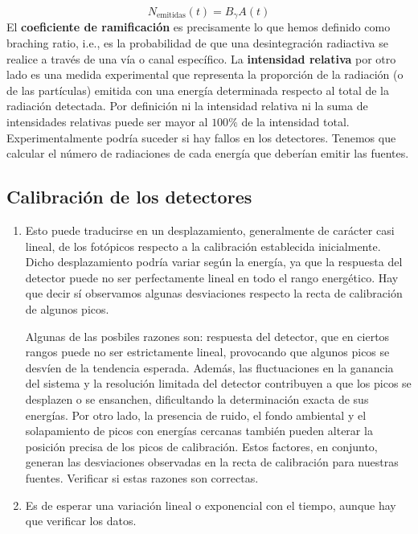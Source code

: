 \documentclass[11pt]{article}
\begin{document}
\begin{enumerate}[label=\alph*)]
    \begin{equation}
        N_{\text{emitidas}} (t) = B_\gamma A(t)
    \end{equation}
    El \textbf{coeficiente de ramificación} es precisamente lo que hemos definido como braching ratio, i.e., es la probabilidad de que una desintegración radiactiva se realice a través de una vía o canal específico. La \textbf{intensidad relativa} por otro lado es una medida experimental que representa la proporción de la radiación (o de las partículas) emitida con una energía determinada respecto al total de la radiación detectada. Por definición ni la intensidad relativa ni la suma de intensidades relativas puede ser mayor al $100\%$ de la intensidad total. Experimentalmente podría suceder si hay fallos en los detectores. \textcolor{BrickRed}{Tenemos que calcular el número de radiaciones de cada energía que deberían emitir las fuentes.}
\end{enumerate}

\subsection{Calibración de los detectores}

\begin{enumerate}[label=\alph*)]
    \item Esto puede traducirse en un desplazamiento, generalmente de carácter casi lineal, de los fotópicos respecto a la calibración establecida inicialmente. Dicho desplazamiento podría variar según la energía, ya que la respuesta del detector puede no ser perfectamente lineal en todo el rango energético. \textcolor{BrickRed}{Hay que decir sí observamos algunas desviaciones respecto la recta de calibración de algunos picos.} 
    
    Algunas de las posbiles razones son: respuesta del detector, que en ciertos rangos puede no ser estrictamente lineal, provocando que algunos picos se desvíen de la tendencia esperada. Además, las fluctuaciones en la ganancia del sistema y la resolución limitada del detector contribuyen a que los picos se desplazen o se ensanchen, dificultando la determinación exacta de sus energías. Por otro lado, la presencia de ruido, el fondo ambiental y el solapamiento de picos con energías cercanas también pueden alterar la posición precisa de los picos de calibración. Estos factores, en conjunto, generan las desviaciones observadas en la recta de calibración para nuestras fuentes. \textcolor{BrickRed}{Verificar si estas razones son correctas.}
    \item  \textcolor{BrickRed}{Es de esperar una variación lineal o exponencial con el tiempo, aunque hay que verificar los datos.}
\end{enumerate}
\end{document}
